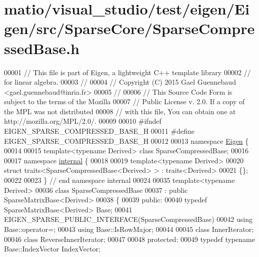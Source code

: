 \hypertarget{matio_2visual__studio_2test_2eigen_2_eigen_2src_2_sparse_core_2_sparse_compressed_base_8h_source}{}\section{matio/visual\+\_\+studio/test/eigen/\+Eigen/src/\+Sparse\+Core/\+Sparse\+Compressed\+Base.h}
\label{matio_2visual__studio_2test_2eigen_2_eigen_2src_2_sparse_core_2_sparse_compressed_base_8h_source}

\begin{DoxyCode}
00001 \textcolor{comment}{// This file is part of Eigen, a lightweight C++ template library}
00002 \textcolor{comment}{// for linear algebra.}
00003 \textcolor{comment}{//}
00004 \textcolor{comment}{// Copyright (C) 2015 Gael Guennebaud <gael.guennebaud@inria.fr>}
00005 \textcolor{comment}{//}
00006 \textcolor{comment}{// This Source Code Form is subject to the terms of the Mozilla}
00007 \textcolor{comment}{// Public License v. 2.0. If a copy of the MPL was not distributed}
00008 \textcolor{comment}{// with this file, You can obtain one at http://mozilla.org/MPL/2.0/.}
00009 
00010 \textcolor{preprocessor}{#ifndef EIGEN\_SPARSE\_COMPRESSED\_BASE\_H}
00011 \textcolor{preprocessor}{#define EIGEN\_SPARSE\_COMPRESSED\_BASE\_H}
00012 
00013 \textcolor{keyword}{namespace }\hyperlink{namespace_eigen}{Eigen} \{ 
00014 
00015 \textcolor{keyword}{template}<\textcolor{keyword}{typename} Derived> \textcolor{keyword}{class }SparseCompressedBase;
00016   
00017 \textcolor{keyword}{namespace }\hyperlink{namespaceinternal}{internal} \{
00018 
00019 \textcolor{keyword}{template}<\textcolor{keyword}{typename} Derived>
00020 \textcolor{keyword}{struct }traits<SparseCompressedBase<Derived> > : traits<Derived>
00021 \{\};
00022 
00023 \} \textcolor{comment}{// end namespace internal}
00024 
00035 \textcolor{keyword}{template}<\textcolor{keyword}{typename} Derived>
00036 \textcolor{keyword}{class }SparseCompressedBase
00037   : \textcolor{keyword}{public} SparseMatrixBase<Derived>
00038 \{
00039   \textcolor{keyword}{public}:
00040     \textcolor{keyword}{typedef} SparseMatrixBase<Derived> Base;
00041     EIGEN\_SPARSE\_PUBLIC\_INTERFACE(SparseCompressedBase)
00042     \textcolor{keyword}{using} Base::operator=;
00043     \textcolor{keyword}{using} Base::IsRowMajor;
00044     
00045     \textcolor{keyword}{class }InnerIterator;
00046     \textcolor{keyword}{class }ReverseInnerIterator;
00047     
00048   \textcolor{keyword}{protected}:
00049     \textcolor{keyword}{typedef} \textcolor{keyword}{typename} Base::IndexVector IndexVector;

\end{DoxyCode}
